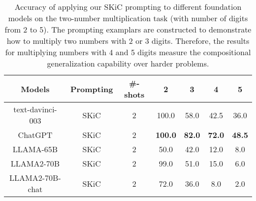 \documentclass{article} \usepackage{arxiv}
\begin{document}
\begin{table}[ht]
\caption{Accuracy of applying our SKiC prompting to different foundation models on the two-number multiplication task (with number of digits from 2 to 5). The prompting examplars are constructed to demonstrate how to multiply two numbers with 2 or 3 digits. Therefore, the results for multiplying numbers with 4 and 5 digits  measure the compositional generalization capability over harder problems.} \label{Tab:mul_results_llama2}
\centering
\begin{tabular}{c|c|c|cc|cc} \toprule
\textbf{Models}            & \textbf{Prompting} &\textbf{\#-shots} & \multicolumn{1}{c}{\textbf{2}} & \multicolumn{1}{c|}{\textbf{3}} & \textbf{4}                     & \textbf{5}                     \\ \midrule  \midrule

\multirow{1}{*}{text-davinci-003}  
                           & SKiC  &2             & 100.0                   &58.0                    & 42.5                    &36.0                    \\  
\multirow{1}{*}{ChatGPT}  
                           & SKiC  &2              & \textbf{100.0}                   & \textbf{82.0}                    & \textbf{72.0}                    & \textbf{48.5}                    \\ \midrule


\multirow{1}{*}{LLAMA-65B} 
                           & SKiC    &2            & 50.0                    & 42.0                    & 12.0                    & 8.0                     \\ 

\multirow{1}{*}{LLAMA2-70B} 
                           & SKiC    &2            & 99.0                  & 51.0                    & 15.0                    & 6.0                    \\ 

\multirow{1}{*}{LLAMA2-70B-chat} 
                           & SKiC    &2            & 72.0                    & 36.0                    & 8.0                    & 2.0                     \\  \bottomrule
                     
\end{tabular} 
\end{table}
\end{document}
